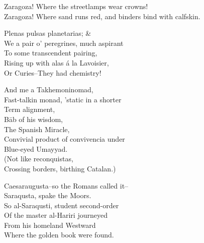 Zaragoza! Where the streetlamps wear crowns! \\
Zaragoza! Where sand runs red, and binders bind with calfskin. 

Plenas pulsas planetarias; \& \\
We a pair o' peregrines, much aspirant \\
To some transcendent pairing, \\
Rising up with alas á la Lavoisier, \\
Or Curies--They had chemistry! 

And me a Takhemoninomad, \\
\quad Fast-talkin monad, 'static in a shorter \\
\qquad Term alignment, \\
Bāb of his wisdom, \\
\quad The Spanish Miracle, \\
\qquad Convivial product of convivencia under \\
Blue-eyed Umayyad. \\
(Not like reconquistas, \\
Crossing borders, birthing Catalan.)

Caesaraugusta--so the Romans called it-- \\
Saraqusta, spake the Moors. \\
So al-Saraqusti, student second-order \\
Of the master al-Hariri journeyed \\
From his homeland Westward \\
Where the golden book were found.